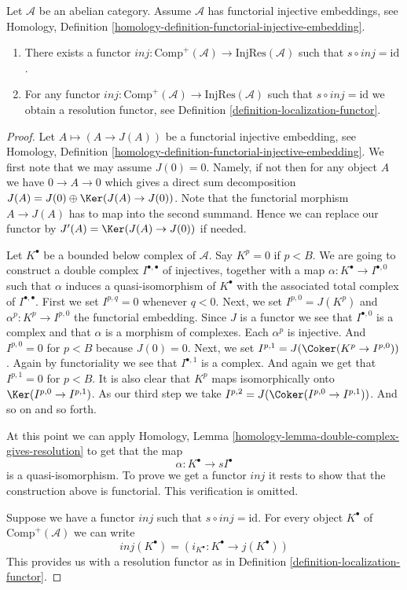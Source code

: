\begin{lemma}
\label{lemma-functorial-injective-resolutions}
Let $\mathcal{A}$ be an abelian category.
Assume $\mathcal{A}$ has functorial injective embeddings, see
Homology, Definition \ref{homology-definition-functorial-injective-embedding}.
\begin{enumerate}
\item There exists a functor
$inj : \text{Comp}^{+}(\mathcal{A}) \to \text{InjRes}(\mathcal{A})$
such that $s \circ inj = \text{id}$.
\item For any functor
$inj : \text{Comp}^{+}(\mathcal{A}) \to \text{InjRes}(\mathcal{A})$
such that $s \circ inj = \text{id}$ we obtain a resolution functor, see
Definition \ref{definition-localization-functor}.
\end{enumerate}
\end{lemma}

\begin{proof}
Let $A \mapsto (A \to J(A))$ be a functorial injective embedding, see
Homology, Definition \ref{homology-definition-functorial-injective-embedding}.
We first note that we may assume $J(0) = 0$. Namely, if not then
for any object $A$ we have $0 \to A \to 0$ which gives
a direct sum decomposition $J(A) = J(0) \oplus \Ker(J(A) \to J(0))$.
Note that the functorial morphism $A \to J(A)$ has to map
into the second summand. Hence we can replace our functor
by $J'(A) = \Ker(J(A) \to J(0))$ if needed.

\medskip\noindent
Let $K^\bullet$ be a bounded below complex of $\mathcal{A}$.
Say $K^p = 0$ if $p < B$.
We are going to construct a double complex $I^{\bullet, \bullet}$
of injectives, together with a map $\alpha : K^\bullet \to I^{\bullet, 0}$
such that $\alpha$ induces a quasi-isomorphism of $K^\bullet$
with the associated total complex of $I^{\bullet, \bullet}$.
First we set $I^{p, q} = 0$ whenever $q < 0$.
Next, we set $I^{p, 0} = J(K^p)$ and $\alpha^p : K^p \to I^{p, 0}$
the functorial embedding. Since $J$ is a functor we see that
$I^{\bullet, 0}$ is a complex and that $\alpha$ is a
morphism of complexes. Each $\alpha^p$ is injective. And
$I^{p, 0} = 0$ for $p < B$ because $J(0) = 0$. Next, we set
$I^{p, 1} = J(\Coker(K^p \to I^{p, 0}))$. Again by functoriality
we see that $I^{\bullet, 1}$ is a complex. And again we get
that $I^{p, 1} = 0$ for $p < B$. It is also clear that
$K^p$ maps isomorphically onto $\Ker(I^{p, 0} \to I^{p, 1})$.
As our third step we take $I^{p, 2} = J(\Coker(I^{p, 0} \to I^{p, 1}))$.
And so on and so forth.

\medskip\noindent
At this point we can apply
Homology, Lemma \ref{homology-lemma-double-complex-gives-resolution}
to get that the map
$$
\alpha : K^\bullet \to sI^\bullet
$$
is a quasi-isomorphism. To prove we get a functor $inj$ it
rests to show that the construction above
is functorial. This verification is omitted.

\medskip\noindent
Suppose we have a functor $inj$ such that $s \circ inj = \text{id}$.
For every object $K^\bullet$ of $\text{Comp}^{+}(\mathcal{A})$
we can write
$$
inj(K^\bullet) = (i_{K^\bullet} : K^\bullet \to j(K^\bullet))
$$
This provides us with a resolution functor as in
Definition \ref{definition-localization-functor}.
\end{proof}

